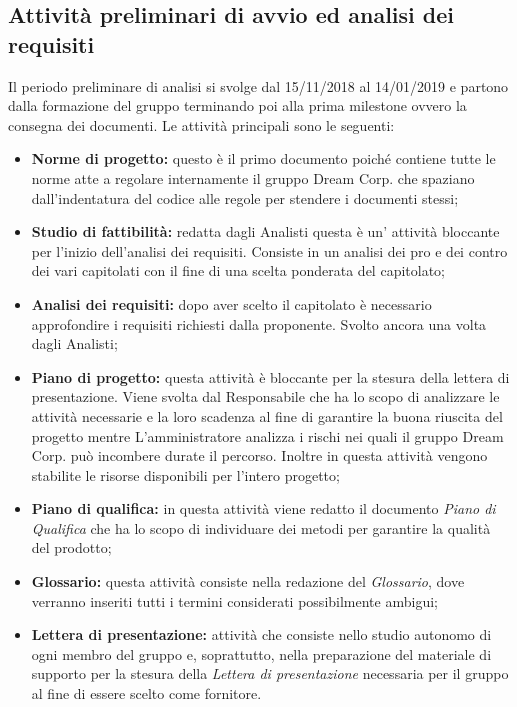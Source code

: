 \newpage
\subsection{Attività preliminari di avvio ed analisi dei requisiti}
Il periodo preliminare di analisi si svolge dal 15/11/2018 al 14/01/2019 e partono dalla formazione del gruppo terminando poi alla prima milestone ovvero la consegna dei documenti. \newline
Le attività principali sono le seguenti:
\begin{itemize}
	\item\textbf{Norme di progetto:} questo è il primo documento poiché contiene tutte le norme atte a regolare internamente il gruppo Dream Corp. che spaziano dall'indentatura del codice alle regole per stendere i documenti stessi;
	\item\textbf{Studio di fattibilità:} redatta dagli Analisti questa è un' attività bloccante per l'inizio dell'analisi dei requisiti. Consiste in un analisi dei pro e dei contro dei vari capitolati con il fine di una scelta ponderata del capitolato;
	\item\textbf{Analisi dei requisiti:} dopo aver scelto il capitolato è necessario approfondire i requisiti richiesti dalla proponente. Svolto ancora una volta dagli Analisti;
	\item\textbf{Piano di progetto:} questa attività è bloccante per la stesura della lettera di presentazione. Viene svolta dal Responsabile che ha lo scopo di analizzare le attività necessarie e la loro scadenza al fine di garantire la  buona riuscita del progetto mentre L'amministratore analizza i rischi nei quali il gruppo Dream Corp. può incombere durate il percorso. Inoltre in questa attività vengono stabilite le risorse disponibili per l'intero progetto;
	\item\textbf{Piano di qualifica:} in questa attività viene redatto il documento \textit{Piano di Qualifica} che ha lo scopo di individuare dei metodi per garantire la qualità del prodotto;
	\item\textbf{Glossario:} questa attività consiste nella redazione del \textit{Glossario}, dove verranno inseriti tutti i termini considerati possibilmente ambigui;
	\item\textbf{Lettera di presentazione:} attività che consiste nello studio autonomo di ogni membro del gruppo e, soprattutto, nella preparazione del materiale di supporto per la stesura della \textit{Lettera di presentazione} necessaria per il gruppo al fine di essere scelto come fornitore.
\end{itemize}

